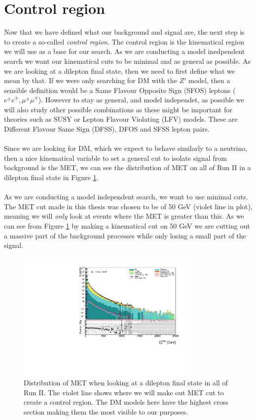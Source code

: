 \documentclass[14pt, a4paper]{book}
\begin{document}
\section{Control region}
Now that we have defined what our background and signal are, the next step is to create a so-called \textit{control region}. The control region is the kinematical region we will use as a base for our search. As we are conducting a model inedpendent search we want 
our kinematical cuts to be minimal and as general as possible. As we are looking at a dilepton final state, then we need to first define what we mean by that. If we were only searching for DM with the $Z'$ model, then a sensible definition would be a 
Same Flavour Opposite Sign (SFOS) leptons ($e^\pm e^\mp, \mu^\pm\mu^\mp$). However to stay as general, and model independet, as possible we will also study other possible combinations as these might be important for theories such as SUSY or Lepton Flavour Violating 
(LFV) models. These are Different Flavour Same Sign (DFSS), DFOS and SFSS lepton pairs.\\
\\Since we are looking for DM, which we expect to behave similarly to a neutrino, then a nice kinematical variable to set a general cut to isolate signal from background is the MET, we can see the 
distribution of MET on all of Run II in a dilepton final state in Figure \ref{fig:uncut_met}.\\
\\As we are conducting a model independent search, we want to use minimal cuts. The MET cut made in this thesis was chosen to be of 50 GeV (violet line in plot), meaning we will \textit{only} look at events where the MET is greater than this. As we can see from Figure \ref{fig:uncut_met} 
by making a kinematical cut on 50 GeV we are cutting out a massive part of the background processes while only losing a small part of the signal. \\
\graphicspath{{../../../Plots/Data_Analysis/SRs/Uncut/}} 
\begin{figure}[!ht]
    \centering
    \includegraphics[width=0.8\textwidth]{met.pdf}
    \caption[$E_T^{miss}$ distribution in dilepton final state Run II]{Distribution of MET when looking at a dilepton final state in all of Run II. The violet line shows where we will make out MET cut to create a control region. The DM models here have the highest cross section making them the most visible to our purposes.}\label{fig:uncut_met}
\end{figure}
\end{document}
